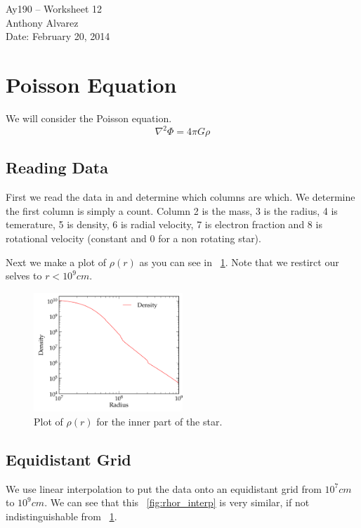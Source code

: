 \documentclass[11pt,letterpaper]{article}
\begin{document}
\begin{center}
\Large
Ay190 -- Worksheet 12\\
Anthony Alvarez\\
Date: February 20, 2014
\end{center}

\section{Poisson Equation}

We will consider the Poisson equation.
$$ \nabla^2\Phi = 4\pi G\rho$$

\subsection{Reading Data}

First we read the data in and determine which columns are which. We determine
the first column is simply a count. Column 2 is the mass, 3 is the radius, 4 is
temerature, 5 is density, 6 is radial velocity, 7 is electron fraction and 8 is
rotational velocity (constant and 0 for a non rotating star). 

Next we make a plot of $\rho(r)$ as you can see in ~\ref{fig:rhor}. Note that 
we restirct our selves to $r < 10^9 cm$.

\begin{figure}[bth]
\centering
\includegraphics[width=0.5\textwidth]{1.pdf}
\caption{Plot of $\rho(r)$ for the inner part of the star. }
\label{fig:rhor}
\end{figure}

\subsection{Equidistant Grid}

We use linear interpolation to put the data onto an equidistant grid from
$10^7cm$ to $10^9cm$. We can see that this ~\ref{fig:rhor_interp} is very 
similar, if not indistinguishable from ~\ref{fig:rhor}. 
\end{document}
